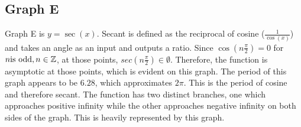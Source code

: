\subsection{Graph E}

Graph E is $y=\sec(x)$.
Secant is defined as the reciprocal of cosine ($\frac{1}{\cos(x)}$) and takes an angle as an input and outputs a ratio.
Since ${\cos(n{\frac{\pi}{2}})=0}$ for ${n \text{is odd}, n\in \mathbb{Z}}$, at those points, ${sec(n{\frac{\pi}{2}}) {\in \emptyset}}$.
Therefore, the function is asymptotic at those points, which is evident on this graph.
The period of this graph appears to be ${6.28}$, which approximates ${2\pi}$.
This is the period of cosine and therefore secant.
The function has two distinct branches, one which approaches positive infinity while the other approaches negative infinity on both sides of the graph.
This is heavily represented by this graph. 
